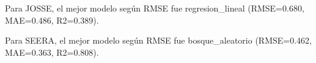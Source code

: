 Para JOSSE, el mejor modelo según RMSE fue regresion_lineal (RMSE=0.680, MAE=0.486, R2=0.389).

Para SEERA, el mejor modelo según RMSE fue bosque_aleatorio (RMSE=0.462, MAE=0.363, R2=0.808).
